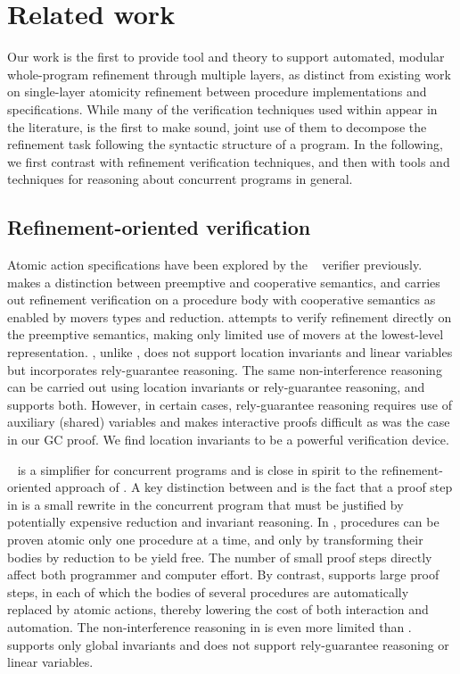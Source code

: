 
\section{Related work}
\label{sec:related}

Our work is the first to provide tool and theory to support automated,
modular whole-program refinement through multiple layers, as distinct from existing work on
single-layer atomicity refinement between procedure implementations and
specifications. 
While many of the verification techniques used within \civl appear in
the literature, \civl is the first to make sound, joint use of them to
decompose the refinement task following the syntactic structure of a
program. In the following, we first contrast \civl with refinement
verification techniques, and then with tools and
techniques for reasoning about concurrent programs in general. 

\subsection{Refinement-oriented verification}
Atomic action specifications have been explored by the
\calvin~\cite{FlanaganFQS05,FreundQ04} verifier previously. 
\civl makes a distinction between preemptive and cooperative
semantics, and carries out refinement verification on a procedure body
with cooperative semantics as enabled by movers types and reduction.
\calvin attempts to verify refinement directly on the preemptive
semantics, making only limited use of movers at the lowest-level
representation. 
\calvin, unlike \civl, does not support location invariants and linear
variables but incorporates rely-guarantee reasoning. 
The same non-interference reasoning can be carried out using location
invariants or rely-guarantee reasoning, and \civl supports both.  
However, in certain cases, rely-guarantee reasoning
requires use of auxiliary (shared) variables and makes interactive
proofs difficult as was the case in our GC proof. We find location
invariants to be a powerful verification device.  

\QED~\cite{ElmasQT09} is a simplifier for concurrent programs and is close in spirit to the 
refinement-oriented approach of \civl.
A key distinction between \civl and \QED is the fact that a proof step in \QED is a small rewrite in the concurrent program
that must be justified by potentially expensive reduction and invariant reasoning.
In \QED, procedures can be proven atomic only one procedure at a time, and only by
transforming their bodies by reduction to be yield free. 
The number of small proof steps directly affect both programmer
and computer effort. 
By contrast, \civl supports large proof steps, in each of which the bodies of several procedures
are automatically replaced by atomic actions, thereby lowering the cost of both interaction and automation.
The non-interference reasoning in \QED is even more limited than \calvin.
\QED supports only global invariants and does not support rely-guarantee reasoning or linear variables.

